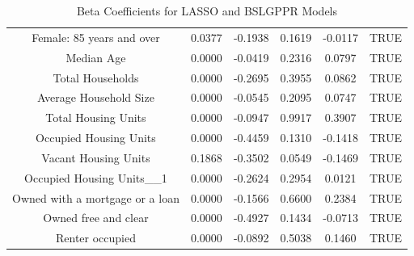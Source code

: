 \documentclass{article} %
\begin{document}
\begin{table}[H]
\begin{adjustbox}{width = \textwidth}
\begin{tabular}{cccccc}
  Female: 85 years and over & 0.0377 & -0.1938 & 0.1619 & -0.0117 & TRUE \\ 
  Median Age & 0.0000 & -0.0419 & 0.2316 & 0.0797 & TRUE \\ 
  Total Households & 0.0000 & -0.2695 & 0.3955 & 0.0862 & TRUE \\ 
  Average Household Size & 0.0000 & -0.0545 & 0.2095 & 0.0747 & TRUE \\ 
  Total Housing Units & 0.0000 & -0.0947 & 0.9917 & 0.3907 & TRUE \\ 
  Occupied Housing Units & 0.0000 & -0.4459 & 0.1310 & -0.1418 & TRUE \\ 
  Vacant Housing Units & 0.1868 & -0.3502 & 0.0549 & -0.1469 & TRUE \\ 
  Occupied Housing Units\_\_1 & 0.0000 & -0.2624 & 0.2954 & 0.0121 & TRUE \\ 
  Owned with a mortgage or a loan & 0.0000 & -0.1566 & 0.6600 & 0.2384 & TRUE \\ 
  Owned free and clear & 0.0000 & -0.4927 & 0.1434 & -0.0713 & TRUE \\ 
  Renter occupied & 0.0000 & -0.0892 & 0.5038 & 0.1460 & TRUE \\ 
   \hline
\end{tabular}

\end{adjustbox}
\caption{Beta Coefficients for LASSO and BSLGPPR Models}
\label{table:betacoef}
\end{table}
\end{document}
